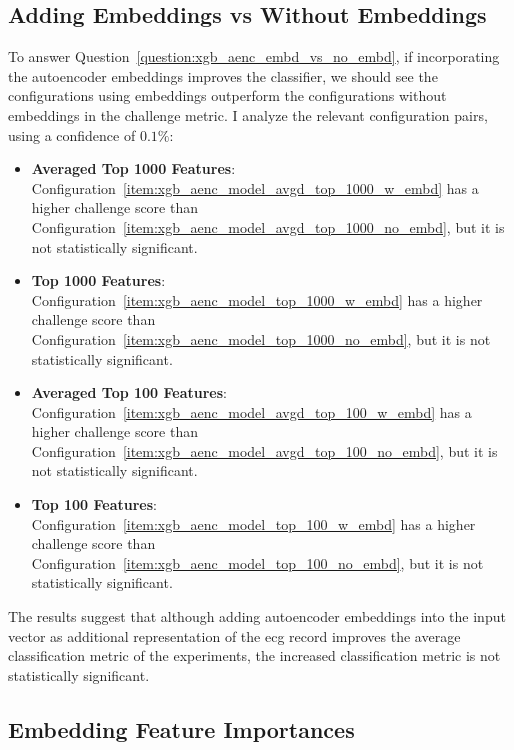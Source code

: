 \documentclass[\main/thesis.tex]{subfiles}
\begin{document}
\subsection{Adding Embeddings vs Without Embeddings}
To answer Question~\ref{question:xgb_aenc_embd_vs_no_embd}, if incorporating the autoencoder embeddings improves the classifier, we should see the configurations using embeddings outperform the configurations without embeddings in the challenge metric. 
I analyze the relevant configuration pairs, using a confidence of $0.1\%$:
\begin{itemize}
    \item \textbf{Averaged Top 1000 Features}: Configuration~\ref{item:xgb_aenc_model_avgd_top_1000_w_embd} has a higher challenge score than Configuration~\ref{item:xgb_aenc_model_avgd_top_1000_no_embd}, but it is not statistically significant.
    \item \textbf{Top 1000 Features}: Configuration~\ref{item:xgb_aenc_model_top_1000_w_embd} has a higher challenge score than Configuration~\ref{item:xgb_aenc_model_top_1000_no_embd}, but it is not statistically significant.
    \item \textbf{Averaged Top 100 Features}: Configuration~\ref{item:xgb_aenc_model_avgd_top_100_w_embd} has a higher challenge score than Configuration~\ref{item:xgb_aenc_model_avgd_top_100_no_embd}, but it is not statistically significant.
    \item \textbf{Top 100 Features}: Configuration~\ref{item:xgb_aenc_model_top_100_w_embd} has a higher challenge score than Configuration~\ref{item:xgb_aenc_model_top_100_no_embd}, but it is not statistically significant.
\end{itemize}

The results suggest that although adding autoencoder embeddings into the input vector as additional representation of the \gls{ecg} record improves the average classification metric of the experiments, the increased classification metric is not statistically significant.

\subsection{Embedding Feature Importances}
\label{ssec:xgb_aenc_embd_feat_importances}
\end{document}
